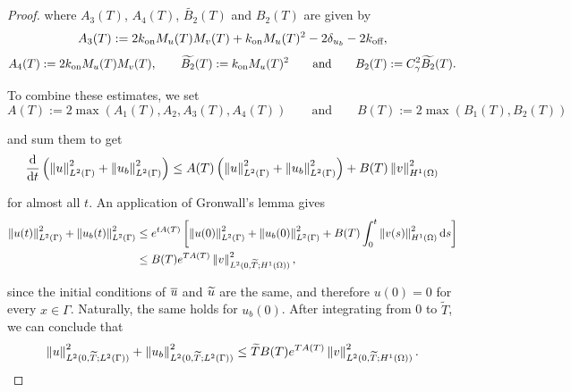 \begin{proof}
    \noindent
    where $A_3(T)$, $A_4(T)$, $\widetilde{B_2}(T)$ and $B_2(T)$ are given by
%
    \begin{equation*}
        A_3(T) := 2 k_\text{on} M_u(T) M_v(T) + k_\text{on} M_u(T)^2 - 2 \delta_{u_b} - 2 k_\text{off} ,
    \end{equation*}
    \begin{equation*}
        A_4(T) := 2 k_\text{on} M_u(T) M_v(T), \qquad \widetilde{B_2}(T) := k_\text{on} M_u(T)^2  \qquad \text{and} \qquad B_2(T) := C_\gamma^2 \widetilde{B_2}(T) .
    \end{equation*}
    
    \noindent
    To combine these estimates, we set
    \begin{equation*}
        A(T) := 2 \max \left(A_1(T), A_2, A_3(T), A_4(T)\right) \qquad \text{and} \qquad B(T) := 2 \max \left(B_1(T), B_2(T)\right)
    \end{equation*}

    \noindent
    and sum them to get
%
    \begin{equation*}
        \frac{\mathop{}\!\mathrm{d}}{\mathop{}\!\mathrm{d} t} \left(\left\| u \right\|_{L^2(\Gamma)}^2 + \left\| u_b \right\|_{L^2(\Gamma)}^2\right) \leq A(T) \left(\left\| u \right\|_{L^2(\Gamma)}^2 + \left\| u_b \right\|_{L^2(\Gamma)}^2\right) + B(T) \left\| v \right\|_{H^1(\Omega)}^2
    \end{equation*}

    \noindent
    for almost all $t$. An application of Gronwall's lemma gives
    \begin{equation*}
    \begin{aligned}
        \left\| u(t) \right\|_{L^2(\Gamma)}^2 + \left\| u_b(t) \right\|_{L^2(\Gamma)}^2 &\leq e^{t A(T)} \left[ \left\| u(0) \right\|_{L^2(\Gamma)}^2 + \left\| u_b(0) \right\|_{L^2(\Gamma)}^2 + B(T) \int_{0}^{t} \left\| v(s) \right\|_{H^1(\Omega)}^2 \mathop{}\!\mathrm{d} s \right] \\
        &\leq B(T) e^{T A(T)} \left\| v \right\|_{L^2(0, \widetilde{T}; H^1(\Omega))}^2 , \\
    \end{aligned}
    \end{equation*}

    \noindent
    since the initial conditions of $\overline{u}$ and $\widetilde{u}$ are the same, and therefore $u(0) = 0$ for every $x \in \Gamma$. Naturally, the same holds for $u_b(0)$. After integrating from 0 to $\widetilde{T}$, we can conclude that
%
    \begin{equation*}
        \left\| u \right\|_{L^2(0, \widetilde{T}; L^2(\Gamma))}^2 + \left\| u_b \right\|_{L^2(0, \widetilde{T}; L^2(\Gamma))}^2 \leq \widetilde{T} B(T) e^{T A(T)} \left\| v \right\|_{L^2(0, \widetilde{T}; H^1(\Omega))}^2 .
    \end{equation*}


\end{proof}
